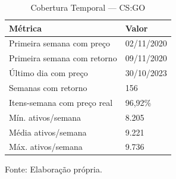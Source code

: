 \begin{table}[H]
\caption{Cobertura Temporal — CS:GO}\label{tab:coverage_daily} 

\fontsize{12.0pt}{14.4pt}\selectfont

\begin{tabular*}{\linewidth}{@{\extracolsep{\fill}}ll}
\toprule
\textbf{Métrica} & \textbf{Valor} \\
\midrule\addlinespace[2.5pt]
Primeira semana com preço & 02/11/2020 \\
Primeira semana com retorno & 09/11/2020 \\
Último dia com preço & 30/10/2023 \\
Semanas com retorno & 156 \\
Itens-semana com preço real & 96,92\% \\
Mín. ativos/semana & 8.205 \\
Média ativos/semana & 9.221 \\
Máx. ativos/semana & 9.736 \\
\bottomrule
\end{tabular*}
\par\vspace{\belowcaptionskip}\footnotesize Fonte: Elaboração própria.\par

\end{table}
